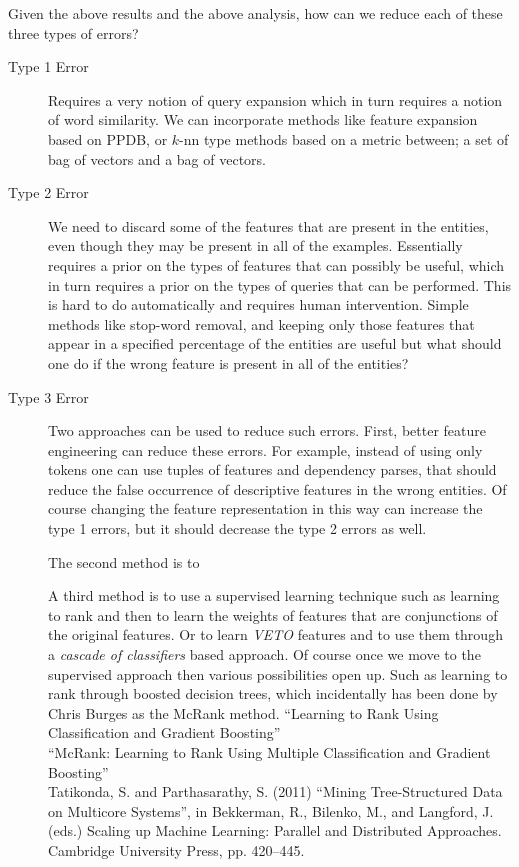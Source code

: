 \documentclass{article}
\begin{document}
Given the above results and the above analysis, how can we reduce each of these
three types of errors?
\begin{description}
\item[Type 1 Error] Requires a very notion of query expansion which in turn
  requires a notion of word similarity. We can
  incorporate methods like feature expansion based on PPDB, or $k$-nn type
  methods based on a metric between; a set of bag of vectors and a bag of
  vectors.
\item[Type 2 Error] We need to discard some of the features that are present in
  the entities, even though they may be present in all of the examples.
  Essentially requires a prior on the types
  of features that can possibly be useful, which in turn requires a prior on the
  types of queries that can be performed. This is hard to do automatically and
  requires human intervention. Simple methods like stop-word removal, and
  keeping only those features that appear in a specified percentage of the
  entities are useful but what should one do if the wrong feature is present in
  all of the entities?
\item[Type 3 Error] Two approaches can be used to reduce such errors.
  First, better feature engineering can
  reduce these errors. For example, instead of using only tokens one can use
  tuples of features and dependency parses, that should reduce the false
  occurrence of descriptive features in the wrong entities. Of course changing
  the feature representation in this way can increase the type 1 errors, but it
  should decrease the type 2 errors as well.

  The second method is to

  A third method is to use a supervised learning technique such as learning to
  rank and then to learn the weights of features that are conjunctions of the
  original features. Or to learn \textit{VETO} features and to use them through
  a \textit{cascade of classifiers} based approach. Of course once we move to
  the supervised approach then various possibilities open up. Such as learning
  to rank through boosted decision trees, which incidentally has been done by
  Chris Burges as the McRank method.
  ``Learning to Rank Using Classification and Gradient Boosting''\\
  ``McRank: Learning to Rank Using Multiple Classification and Gradient
  Boosting''\\
  Tatikonda, S. and Parthasarathy, S. (2011) ``Mining Tree-Structured Data on
  Multicore Systems'', in Bekkerman, R., Bilenko, M., and Langford, J. (eds.)
  Scaling up Machine Learning: Parallel and Distributed Approaches. Cambridge
  University Press, pp. 420–445.
\end{description}
\end{document}
